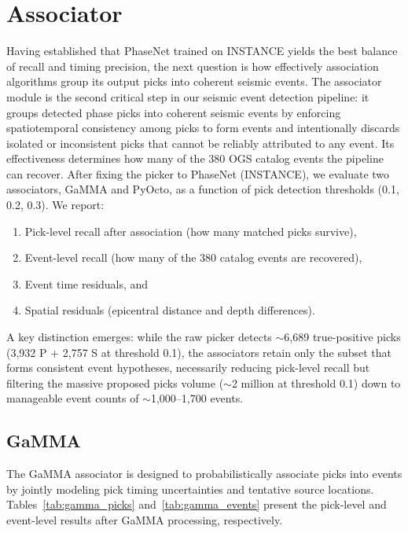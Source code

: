 \section{Associator}
Having established that PhaseNet trained on INSTANCE yields the best balance of
recall and timing precision, the next question is how effectively association
algorithms group its output picks into coherent seismic events. The associator
module is the second critical step in our seismic event detection pipeline: it
groups detected phase picks into coherent seismic events by enforcing
spatiotemporal consistency among picks to form events and intentionally
discards isolated or inconsistent picks that cannot be reliably attributed to
any event. Its effectiveness determines how many of the 380 OGS catalog events
the pipeline can recover. After fixing the picker to PhaseNet (INSTANCE), we
evaluate two associators, GaMMA and PyOcto, as a function of pick detection
thresholds (0.1, 0.2, 0.3). We report:
\begin{enumerate}
  \item Pick-level recall after association (how many matched picks survive),
  \item Event-level recall (how many of the 380 catalog events are recovered),
  \item Event time residuals, and
  \item Spatial residuals (epicentral distance and depth differences).
\end{enumerate}
A key distinction emerges: while the raw picker detects $\sim$6,689
true-positive picks (3,932 P $+$ 2,757 S at threshold 0.1), the associators
retain only the subset that forms consistent event hypotheses, necessarily
reducing pick-level recall but filtering the massive proposed picks volume
($\sim$2 million at threshold 0.1) down to manageable event counts of
$\sim$1,000--1,700 events.

\subsection{GaMMA}
The GaMMA associator is designed to probabilistically associate picks into
events by jointly modeling pick timing uncertainties and tentative source
locations. Tables~\ref{tab:gamma_picks} and~\ref{tab:gamma_events} present the
pick-level and event-level results after GaMMA processing, respectively.

